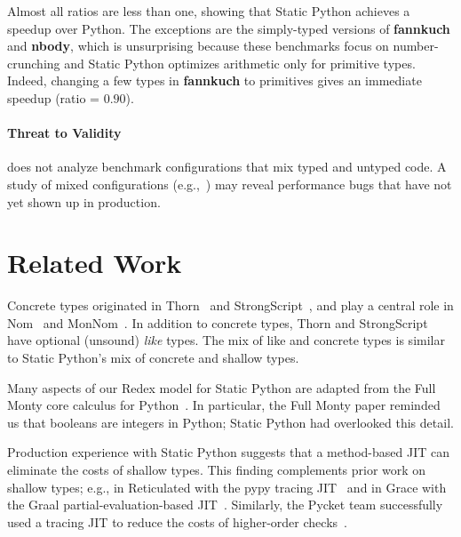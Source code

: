 \documentclass[english,cleveref,submission]{programming}
\newcommand{\SP}{Static Python}
\newcommand{\bmname}[1]{\textbf{#1}}
\begin{document}
Almost all ratios are less than one, showing that \SP{} achieves a speedup over
Python.
The exceptions are the simply-typed versions of \bmname{fannkuch} and
\bmname{nbody}, which is unsurprising because these benchmarks focus
on number-crunching and \SP{} optimizes arithmetic only for primitive types.
Indeed, changing a few types in \bmname{fannkuch} to primitives
gives an immediate speedup (ratio = $0.90$).


\paragraph{Threat to Validity}

 does not analyze benchmark configurations that mix
typed and untyped code. %
A study of mixed configurations (e.g.,~\cite{gm-pepm-2018,gtnffvf-jfp-2019})
may reveal performance bugs that have not yet shown up in production.


\section{Related Work}
\label{s:related}

Concrete types originated in Thorn~\cite{bfnorsvw-oopsla-2009,wnlov-popl-2010}
and StrongScript~\cite{rzv-ecoop-2015},
and play a central role in Nom~\cite{mt-oopsla-2017} and MonNom~\cite{mt-oopsla-2021}.
In addition to concrete types, Thorn and StrongScript have optional (unsound) \emph{like} types.
The mix of like and concrete types is similar to \SP{}'s mix of concrete and shallow
types.

Many aspects of our Redex model for \SP{} are adapted from the Full Monty core calculus
for Python~\cite{pmmwplck-oopsla-2013}.
In particular, the Full Monty paper reminded us that booleans are integers in Python;
\SP{} had overlooked this detail.

Production experience with \SP{} suggests that a method-based JIT can
eliminate the costs of shallow types.
This finding complements prior work on shallow types;
e.g., in Reticulated with the pypy tracing JIT~\cite{vsc-dls-2019}
and in Grace with the Graal partial-evaluation-based JIT~\cite{rmhn-ecoop-2019,grmhn-vmil-2019}.
Similarly, the Pycket team successfully used a tracing JIT to reduce the costs of higher-order
checks~\cite{bbst-oopsla-2017}.
\end{document}
